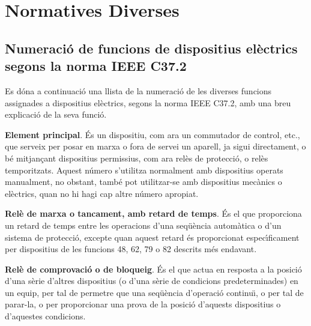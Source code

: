 \chapter{Normatives Diverses}

\section{Numeraci\'{o} de funcions de dispositius el\`{e}ctrics segons la norma \textsf{IEEE C37.2} }\label{sec:ieee-c37-2}

Es d\'{o}na a continuaci\'{o} una llista de la numeraci\'{o} de les diverses funcions assignades a dispositius
el\`{e}ctrics, segons la norma \textsf{IEEE C37.2}, amb una breu
explicaci\'{o} de la seva funci\'{o}.

\begin{multicols}{2}
\begin{list}{}
{\setlength{\labelwidth}{6mm} \setlength{\leftmargin}{6mm}
\setlength{\labelsep}{2mm}}

\item[\textbf{1}]  
\textbf{Element principal}. \'{E}s un dispositiu, com ara un commutador de control, etc., que serveix per posar en marxa o fora de servei un aparell, ja sigui directament, o b\'{e}  mitjan\c{c}ant
dispositius permissius, com ara rel\`{e}s de protecci\'{o}, o rel\`{e}s temporitzats. Aquest n\'{u}mero s'utilitza normalment amb dispositius operats manualment, no obstant, tamb\'{e} pot utilitzar-se amb dispositius mec\`{a}nics o el\`{e}ctrics, quan no hi hagi cap altre n\'{u}mero apropiat.

\item[\textbf{2}]    
  
\textbf{Rel\`{e}
de marxa o tancament, amb retard de temps}. \'{E}s el que
proporciona un retard de temps entre les operacions d'una seq\"{u}\`{e}ncia
autom\`{a}tica o d'un sistema de protecci\'{o}, excepte quan aquest retard
\'{e}s proporcionat espec\'{\i}ficament per dispositius de les funcions 48, 62, 79 o 82
descrits m\'{e}s endavant.

\item[\textbf{3}]  
 \textbf{Rel\`{e} de comprovaci\'{o} o
de bloqueig}. \'{E}s el que actua en resposta a la posici\'{o} d'una s\`{e}rie
d'altres dispositius (o d'una s\`{e}rie de condicions predeterminades)
en un equip, per tal de permetre que una seq\"{u}\`{e}ncia d'operaci\'{o}
continu\"{\i}, o per tal de parar-la, o per proporcionar una prova de la
posici\'{o} d'aquests dispositius o d'aquestes condicions.


\end{list}
\end{multicols}
